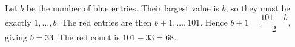 Let $b$ be the number of blue entries. Their largest value is $b$, so they must be exactly $1,\ldots,b$. The red entries are then $b+1,\ldots,101$. Hence $b+1=\dfrac{101-b}{2}$, giving $b=33$. The red count is $101-33=\boxed{68}$.

